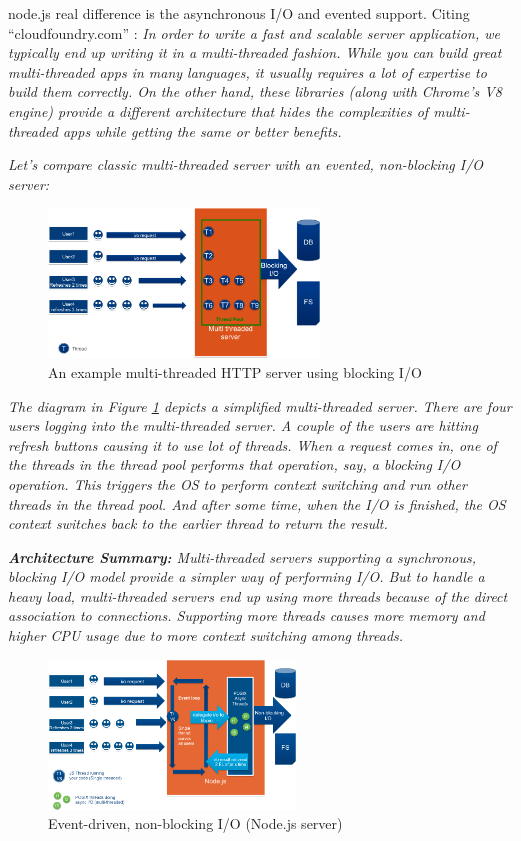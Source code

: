 node.js real difference is the asynchronous I/O and evented support. Citing ``cloudfoundry.com'' \cite{website:cloudfoundry}: \textit{In order to write a fast and scalable server application, we typically end up writing it in a multi-threaded fashion. While you can build great multi-threaded apps in many languages, it usually requires a lot of expertise to build them correctly. On the other hand, these libraries (along with Chrome’s V8 engine) provide a different architecture that hides the complexities of multi-threaded apps while getting the same or better benefits.}

\textit{Let's compare classic multi-threaded server with an evented, non-blocking I/O server:}

\begin{figure}[H]
\centering %
\includegraphics[height=150px]{img/multiThreadedServer.png}
\caption{An example multi-threaded HTTP server using blocking I/O}
\label{fig:multiThreadedServer}
\end{figure}

\textit{The diagram in Figure \ref{fig:multiThreadedServer} depicts a simplified multi-threaded server. There are four users logging into the multi-threaded server. A couple of the users are hitting refresh buttons causing it to use lot of threads. When a request comes in, one of the threads in the thread pool performs that operation, say, a blocking I/O operation. This triggers the OS to perform context switching and run other threads in the thread pool. And after some time, when the I/O is finished, the OS context switches back to the earlier thread to return the result.}

\textit{\textbf{Architecture Summary:} Multi-threaded servers supporting a synchronous, blocking I/O model provide a simpler way of performing I/O. But to handle a heavy load, multi-threaded servers end up using more threads because of the direct association to connections. Supporting more threads causes more memory and higher CPU usage due to more context switching among threads.}

\begin{figure}[H]
\centering %
\includegraphics[height=150px]{img/NodeJS-EventedIOAsyncIO_latest.png}
\caption{Event-driven, non-blocking I/O (Node.js server)}
\label{fig:nodejsServer}
\end{figure}

